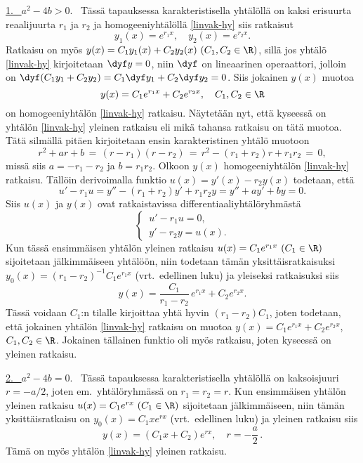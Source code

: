\underline{1. \ $a^2-4b>0$}. \ Tässä tapauksessa karakteristisella yhtälöllä on kaksi erisuurta 
reaalijuurta $r_1$ ja $r_2$ ja homogeeniyhtälöllä \eqref{linvak-hy} siis ratkaisut
\[
y_1(x)=e^{r_1x},\quad y_2(x)=e^{r_2x}.
\]
Ratkaisu on myös $y(x)=C_1y_1(x)+C_2y_2(x)\ (C_1,C_2\in\R)$, sillä jos yhtälö \eqref{linvak-hy}
kirjoitetaan $\dyf y=0$, niin $\dyf$ on lineaarinen operaattori, jolloin on
$\dyf(C_1y_1+C_2y_2)=C_1\dyf y_1+C_2\dyf y_2=0$. Siis jokainen $y(x)$ muotoa
\[
y(x)=C_1e^{r_1x}+C_2e^{r_2x}, \quad C_1,C_2\in\R
\]
on homogeeniyhtälön \eqref{linvak-hy} ratkaisu. Näytetään nyt, että kyseessä on yhtälön
\eqref{linvak-hy} yleinen ratkaisu eli mikä tahansa ratkaisu on tätä muotoa. Tätä silmällä
pitäen kirjoitetaan ensin karakteristinen yhtälö muotoon
\[
r^2+ar+b \,=\, (r-r_1)(r-r_2) \,=\, r^2-(r_1+r_2)r+r_1r_2 \,=\, 0,
\]
missä siis $a=-r_1-r_2$ ja $b=r_1r_2$. Olkoon $y(x)$ homogeeniyhtälön \eqref{linvak-hy}
ratkaisu. Tällöin derivoimalla funktio $u(x)=y'(x)-r_2y(x)$ todetaan, että
\[
u'-r_1u = y''-(r_1+r_2)y'+r_1r_2y = y''+ay'+by=0.
\]
Siis $u(x)$ ja $y(x)$ ovat ratkaistavissa differentiaaliyhtälöryhmästä
\[
\begin{cases}
\,u'-r_1u=0, \\ \,y'-r_2y=u(x).
\end{cases}
\]
Kun tässä ensimmäisen yhtälön yleinen ratkaisu $u(x)=C_1e^{r_1x}\ (C_1\in\R)$ sijoitetaan
jälkimmäiseen yhtälöön, niin todetaan tämän yksittäisratkaisuksi
$y_0(x)=(r_1-r_2)^{-1}C_1e^{r_1x}$ (vrt.\ edellinen luku) ja yleiseksi ratkaisuksi siis
\[
y(x)=\frac{C_1}{r_1-r_2}\,e^{r_1x}+C_2e^{r_2x}.
\]
Tässä voidaan $C_1$:n tilalle kirjoittaa yhtä hyvin $(r_1-r_2)C_1$, joten todetaan, että
jokainen yhtälön \eqref{linvak-hy} ratkaisu on muotoa $y(x)=C_1e^{r_1x}+C_2e^{r_2x}$,
$C_1,C_2\in\R$. Jokainen tällainen funktio oli myös ratkaisu, joten kyseessä on yleinen
ratkaisu.

\underline{2. \ $a^2-4b=0$}. \ Tässä tapauksessa karakteristisella yhtälöllä on kaksoisjuuri 
$r=-a/2$, joten em.\ yhtälöryhmässä on $r_1=r_2=r$. Kun ensimmäisen yhtälön yleinen ratkaisu
$u(x)=C_1e^{rx}\ (C_1\in\R)$ sijoitetaan jälkimmäiseen, niin tämän yksittäisratkaisu on
$y_0(x)=C_1xe^{rx}$ (vrt.\ edellinen luku) ja yleinen ratkaisu siis
\[
y(x)=(C_1x+C_2)e^{rx},\quad r=-\frac{a}{2}\,.
\]
Tämä on myös yhtälön \eqref{linvak-hy} yleinen ratkaisu.

